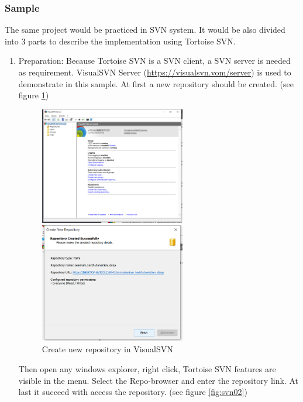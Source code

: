 \documentclass[12pt,a4paper,bibliography=totocnumbered,listof=totocnumbered]{article}
\begin{document}
\subsubsection{Sample}
The same project would be practiced in SVN system. It would be also divided into 3 parts to describe the implementation using Tortoise SVN.
\begin{enumerate}
	\item Preparation: Because Tortoise SVN is a SVN client, a SVN server is needed as requirement. VisualSVN Server (\url{https://visualsvn.vom/server}) is used to demonstrate in this sample. At first a new repository should be created. (see figure \ref{fig:svn01})
	\begin{figure}[H] 
		\begin{minipage}[t]{0.5\linewidth} 
		\centering 
		\includegraphics[width=2.5in]{pics/visualServer.png}  
		\end{minipage}%
		\begin{minipage}[t]{0.5\linewidth} 
		\centering 
		\includegraphics[width=2.5in]{pics/createSVNRepo.png} 
		\end{minipage} %
		\caption{Create new repository in VisualSVN}
		\label{fig:svn01}
	\end{figure} %
	Then open any windows explorer, right click, Tortoise SVN features are visible in the menu. Select the Repo-browser and enter the repository link. At last it succeed with access the repository. (see figure \ref{fig:svn02})
	\begin{figure}[H] 

\end{figure}
\end{enumerate}
\end{document}
